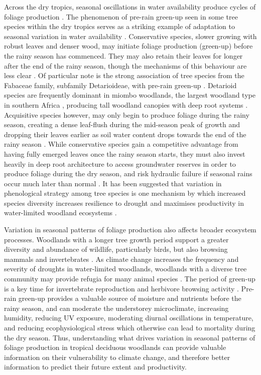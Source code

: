 \documentclass[11pt,a4paper]{article}
\begin{document}
Across the dry tropics, seasonal oscillations in water availability produce cycles of foliage production \citep{Chidumayo2001, Dahlin2016}. The phenomenon of pre-rain green-up seen in some tree species within the dry tropics serves as a striking example of adaptation to seasonal variation in water availability \citep{Ryan2017}. Conservative species, slower growing with robust leaves and denser wood, may initiate foliage production (green-up) before the rainy season has commenced. They may also retain their leaves for longer after the end of the rainy season, though the mechanisms of this behaviour are less clear \citep{Giraldo2011, Kushwaha2011}. Of particular note is the strong association of tree species from the Fabaceae family, subfamily Detarioideae, with pre-rain green-up \citep{Ryan2017}. Detarioid species are frequently dominant in miombo woodlands, the largest woodland type in southern Africa \citep{White1983}, producing tall woodland canopies with deep root systems \citep{Zhou2020}. Acquisitive species however, may only begin to produce foliage during the rainy season, creating a dense leaf-flush during the mid-season peak of growth and dropping their leaves earlier as soil water content drops towards the end of the rainy season \citep{Lasky2016}. While conservative species gain a competitive advantage from having fully emerged leaves once the rainy season starts, they must also invest heavily in deep root architecture to access groundwater reserves in order to produce foliage during the dry season, and risk hydraulic failure if seasonal rains occur much later than normal \citep{Vinya2018}. It has been suggested that variation in phenological strategy among tree species is one mechanism by which increased species diversity increases resilience to drought and maximises productivity in water-limited woodland ecosystems \citep{Stan2019, Morellato2016}. 

Variation in seasonal patterns of foliage production also affects broader ecosystem processes. Woodlands with a longer tree growth period support a greater diversity and abundance of wildlife, particularly birds, but also browsing mammals and invertebrates \citep{Cole2015, Araujo2017, Morellato2016, Ogutu2013}. As climate change increases the frequency and severity of droughts in water-limited woodlands, woodlands with a diverse tree community may provide refugia for many animal species \citep{Bale2002}. The period of green-up is a key time for invertebrate reproduction \citep{Prather2012} and herbivore browsing activity \citep{Velasque2016, Morellato2016}. Pre-rain green-up provides a valuable source of moisture and nutrients before the rainy season, and can moderate the understorey microclimate, increasing humidity, reducing UV exposure, moderating diurnal oscillations in temperature, and reducing ecophysiological stress which otherwise can lead to mortality during the dry season. Thus, understanding what drives variation in seasonal patterns of foliage production in tropical deciduous woodlands can provide valuable information on their vulnerability to climate change, and therefore better information to predict their future extent and productivity.
 
\end{document}
